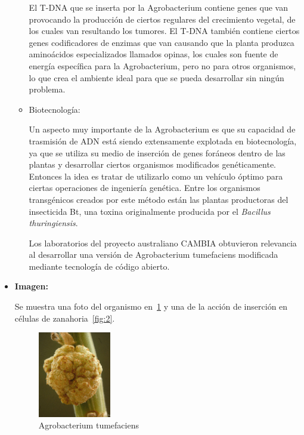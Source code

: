 \begin{itemize}
\begin{itemize}
				El T-DNA que se inserta por la Agrobacterium contiene genes que van provocando la producción de
				ciertos regulares del crecimiento vegetal, de los cuales van resultando los tumores.
				El T-DNA también contiene ciertos genes codificadores de enzimas que van causando que la planta
				produzca aminoácidos especializados llamados opinas, los cuales son fuente de energía
				específica para la Agrobacterium, pero no para otros organismos, lo que crea el ambiente
				ideal para que se pueda desarrollar sin ningún problema.

			\item Biotecnología:

				Un aspecto muy importante de la Agrobacterium es que su capacidad de trasmisión de ADN
				está siendo extensamente explotada en biotecnología, ya que se utiliza su medio de inserción
				de genes foráneos dentro de las plantas y desarrollar ciertos organismos modificados
				genéticamente. Entonces la idea es tratar de utilizarlo como un vehículo óptimo para
				ciertas operaciones de ingeniería genética. Entre los organismos transgénicos creados por
				este método están las plantas productoras del insecticida Bt, una toxina originalmente 
				producida por el \emph{Bacillus thuringiensis}.

				Los laboratorios del proyecto australiano CAMBIA obtuvieron relevancia al desarrollar una versión
				de Agrobacterium tumefaciens modificada mediante tecnología de código abierto.

	\end{itemize}

	\item \textbf{Imagen:}

		Se muestra una foto del organismo en~\ref{fig:1} y una de la acción de inserción en células de zanahoria~\ref{fig:2}.
		\begin{figure}[!h]
			\begin{center}
				\includegraphics[width=0.3\textwidth]{img/bacteria}
			\end{center}
			\caption{Agrobacterium tumefaciens}
			\label{fig:1}
		\end{figure}


\end{itemize}

